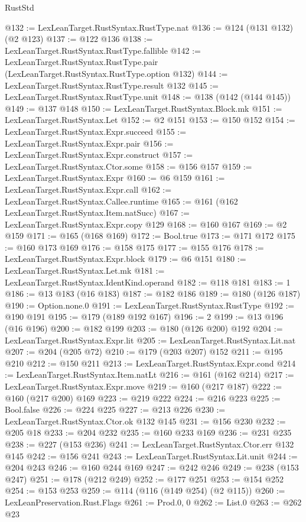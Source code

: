 \begin{lexlean}{RustStd}
\begin{coremodule}
{\begin{coremodule}
{{{{{@132 := LexLeanTarget.RustSyntax.RustType.nat
@136 := @124 (@131 @132) (@2 @123)
@137 := @122 @136
@138 := LexLeanTarget.RustSyntax.RustType.fallible
@142 := LexLeanTarget.RustSyntax.RustType.pair (LexLeanTarget.RustSyntax.RustType.option @132)
@144 := LexLeanTarget.RustSyntax.RustType.result @132
@145 := LexLeanTarget.RustSyntax.RustType.unit
@148 := @138 (@142 (@144 @145))
@149 := @137 @148
@150 := LexLeanTarget.RustSyntax.Block.mk
@151 := LexLeanTarget.RustSyntax.Let
@152 := @2 @151
@153 := @150 @152
@154 := LexLeanTarget.RustSyntax.Expr.succeed
@155 := LexLeanTarget.RustSyntax.Expr.pair
@156 := LexLeanTarget.RustSyntax.Expr.construct
@157 := LexLeanTarget.RustSyntax.Ctor.some
@158 := @156 @157
@159 := LexLeanTarget.RustSyntax.Expr
@160 := @6 @159
@161 := LexLeanTarget.RustSyntax.Expr.call
@162 := LexLeanTarget.RustSyntax.Callee.runtime
@165 := @161 (@162 LexLeanTarget.RustSyntax.Item.natSucc)
@167 := LexLeanTarget.RustSyntax.Expr.copy @129
@168 := @160 @167
@169 := @2 @159
@171 := @165 (@168 @169)
@172 := Bool.true
@173 := @171 @172
@175 := @160 @173 @169
@176 := @158 @175
@177 := @155 @176
@178 := LexLeanTarget.RustSyntax.Expr.block
@179 := @6 @151
@180 := LexLeanTarget.RustSyntax.Let.mk
@181 := LexLeanTarget.RustSyntax.IdentKind.operand
@182 := @118 @181
@183 := 1
@186 := @13 @183 (@16 @183)
@187 := @182 @186
@189 := @180 (@126 @187)
@190 := Option.none.{0}
@191 := LexLeanTarget.RustSyntax.RustType
@192 := @190 @191
@195 := @179 (@189 @192 @167)
@196 := 2
@199 := @13 @196 (@16 @196)
@200 := @182 @199
@203 := @180 (@126 @200) @192
@204 := LexLeanTarget.RustSyntax.Expr.lit
@205 := LexLeanTarget.RustSyntax.Lit.nat
@207 := @204 (@205 @72)
@210 := @179 (@203 @207) @152
@211 := @195 @210
@212 := @150 @211
@213 := LexLeanTarget.RustSyntax.Expr.cond
@214 := LexLeanTarget.RustSyntax.Item.natLt
@216 := @161 (@162 @214)
@217 := LexLeanTarget.RustSyntax.Expr.move
@219 := @160 (@217 @187)
@222 := @160 (@217 @200) @169
@223 := @219 @222
@224 := @216 @223
@225 := Bool.false
@226 := @224 @225
@227 := @213 @226
@230 := LexLeanTarget.RustSyntax.Ctor.ok @132 @145
@231 := @156 @230
@232 := @205 @18
@233 := @204 @232
@235 := @160 @233 @169
@236 := @231 @235
@238 := @227 (@153 @236)
@241 := LexLeanTarget.RustSyntax.Ctor.err @132 @145
@242 := @156 @241
@243 := LexLeanTarget.RustSyntax.Lit.unit
@244 := @204 @243
@246 := @160 @244 @169
@247 := @242 @246
@249 := @238 (@153 @247)
@251 := @178 (@212 @249)
@252 := @177 @251
@253 := @154 @252
@254 := @153 @253
@259 := @114 (@116 (@149 @254) (@2 @115))
@260 := LexLeanPreservation.Rust.Flags
@261 := Prod.{0, 0}
@262 := List.{0}
@263 := @262 @23
}}}}}
\end{coremodule}}
\end{coremodule}
\end{lexlean}
